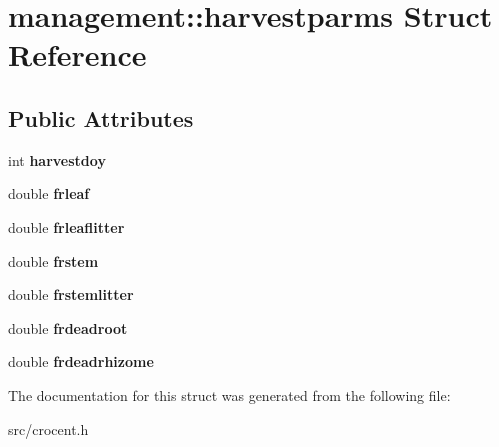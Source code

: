 \hypertarget{structmanagement_1_1harvestparms}{\section{management\-:\-:harvestparms Struct Reference}
\label{structmanagement_1_1harvestparms}
}
\subsection*{Public Attributes}
\begin{DoxyCompactItemize}
\item 
\hypertarget{structmanagement_1_1harvestparms_a6d42c290027ac23091530f38c9b6725c}{int {\bfseries harvestdoy}}\label{structmanagement_1_1harvestparms_a6d42c290027ac23091530f38c9b6725c}

\item 
\hypertarget{structmanagement_1_1harvestparms_a3c525b75c94e2795d039ef02d9b2df5e}{double {\bfseries frleaf}}\label{structmanagement_1_1harvestparms_a3c525b75c94e2795d039ef02d9b2df5e}

\item 
\hypertarget{structmanagement_1_1harvestparms_a4c5a6a01319e06d047f134f425eb5444}{double {\bfseries frleaflitter}}\label{structmanagement_1_1harvestparms_a4c5a6a01319e06d047f134f425eb5444}

\item 
\hypertarget{structmanagement_1_1harvestparms_ad64fd641cabc315bccb4ca07e7ad0dab}{double {\bfseries frstem}}\label{structmanagement_1_1harvestparms_ad64fd641cabc315bccb4ca07e7ad0dab}

\item 
\hypertarget{structmanagement_1_1harvestparms_acbadb8e97c1149d5e3b52966b75e14a3}{double {\bfseries frstemlitter}}\label{structmanagement_1_1harvestparms_acbadb8e97c1149d5e3b52966b75e14a3}

\item 
\hypertarget{structmanagement_1_1harvestparms_ad073c73326fce1be8e29155247a6ec98}{double {\bfseries frdeadroot}}\label{structmanagement_1_1harvestparms_ad073c73326fce1be8e29155247a6ec98}

\item 
\hypertarget{structmanagement_1_1harvestparms_a62d5310c5cbb5b6086504a8d5074c69b}{double {\bfseries frdeadrhizome}}\label{structmanagement_1_1harvestparms_a62d5310c5cbb5b6086504a8d5074c69b}

\end{DoxyCompactItemize}


The documentation for this struct was generated from the following file\-:\begin{DoxyCompactItemize}
\item 
src/crocent.\-h\end{DoxyCompactItemize}
